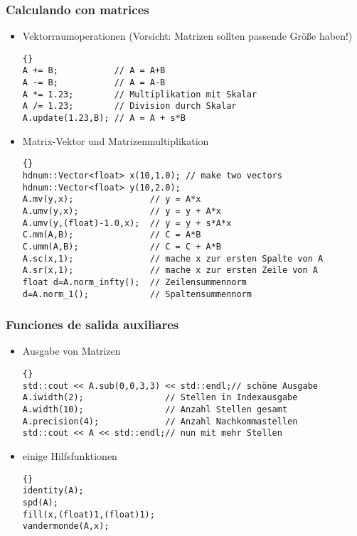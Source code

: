 \documentclass[a4paper,11pt]{article}
\theoremstyle{definition}
\begin{document}
\begin{frame}[fragile]
\frametitle{Calculando con matrices}
\begin{itemize}
\item Vektorraumoperationen (Vorsicht: Matrizen sollten passende Größe haben!)\\
{\footnotesize{\begin{lstlisting}{}
A += B;           // A = A+B
A -= B;           // A = A-B
A *= 1.23;        // Multiplikation mit Skalar
A /= 1.23;        // Division durch Skalar
A.update(1.23,B); // A = A + s*B
\end{lstlisting}}}
\item Matrix-Vektor und Matrizenmultiplikation\\
{\footnotesize{\begin{lstlisting}{}
hdnum::Vector<float> x(10,1.0); // make two vectors
hdnum::Vector<float> y(10,2.0);
A.mv(y,x);               // y = A*x
A.umv(y,x);              // y = y + A*x
A.umv(y,(float)-1.0,x);  // y = y + s*A*x
C.mm(A,B);               // C = A*B
C.umm(A,B);              // C = C + A*B
A.sc(x,1);               // mache x zur ersten Spalte von A
A.sr(x,1);               // mache x zur ersten Zeile von A
float d=A.norm_infty();  // Zeilensummennorm
d=A.norm_1();            // Spaltensummennorm
\end{lstlisting}}}
\end{itemize}
\end{frame}

\begin{frame}[fragile]
\frametitle{Funciones de salida auxiliares}
\begin{itemize}
\item Ausgabe von Matrizen\\
{\footnotesize{\begin{lstlisting}{}
std::cout << A.sub(0,0,3,3) << std::endl;// schöne Ausgabe
A.iwidth(2);                // Stellen in Indexausgabe
A.width(10);                // Anzahl Stellen gesamt
A.precision(4);             // Anzahl Nachkommastellen
std::cout << A << std::endl;// nun mit mehr Stellen
\end{lstlisting}}}
\item einige Hilfsfunktionen
{\footnotesize{\begin{lstlisting}{}
identity(A);
spd(A);
fill(x,(float)1,(float)1);
vandermonde(A,x);
\end{lstlisting}}}
\end{itemize}
\end{frame}
\end{document}
